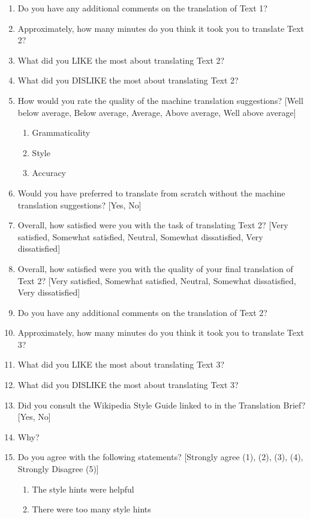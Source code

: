 \begin{enumerate}
    \item Do you have any additional comments on the translation of Text 1?
    \item Approximately, how many minutes do you think it took you to translate Text 2?
    \item What did you LIKE the most about translating Text 2?
    \item What did you DISLIKE the most about translating Text 2?
    \item How would you rate the quality of the machine translation suggestions? [Well below average, Below average, Average, Above average, Well above average]
        \begin{enumerate}
            \item Grammaticality
            \item Style
            \item Accuracy
        \end{enumerate}
    \item Would you have preferred to translate from scratch without the machine translation suggestions? [Yes, No]
    \item Overall, how satisfied were you with the task of translating Text 2? [Very satisfied, Somewhat satisfied, Neutral, Somewhat dissatisfied, Very dissatisfied]
    \item Overall, how satisfied were you with the quality of your final translation of Text 2? [Very satisfied, Somewhat satisfied, Neutral, Somewhat dissatisfied, Very dissatisfied]
    \item Do you have any additional comments on the translation of Text 2?
    \item Approximately, how many minutes do you think it took you to translate Text 3?
    \item What did you LIKE the most about translating Text 3?
    \item What did you DISLIKE the most about translating Text 3?
    \item Did you consult the Wikipedia Style Guide linked to in the Translation Brief? [Yes, No]
    \item Why?
    \item Do you agree with the following statements? [Strongly agree (1), (2), (3), (4), Strongly Disagree (5)]
        \begin{enumerate}
            \item The style hints were helpful
            \item There were too many style hints

\end{enumerate}
\end{enumerate}
